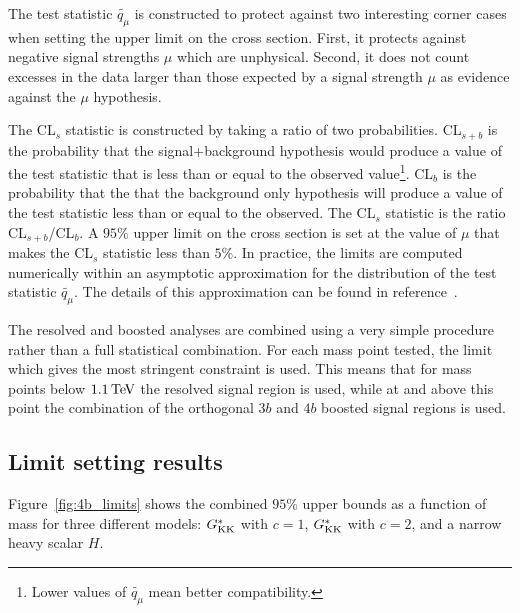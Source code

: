 The test statistic $\widetilde{q_{\mu}}$ is constructed to protect against two interesting corner cases when setting the upper limit on the cross section. First, it protects against negative signal strengths $\mu$ which are unphysical. Second, it does not count excesses in the data larger than those expected by a signal strength $\mu$ as evidence against the $\mu$ hypothesis. 

The CL$_{s}$ statistic is constructed by taking a ratio of two probabilities. CL$_{s+b}$ is the probability that the signal+background hypothesis would produce a value of the test statistic that is less than or equal to the observed value\footnote{Lower values of $\widetilde{q_{\mu}}$ mean better compatibility.}. CL$_{b}$ is the probability that the that the background only hypothesis will produce a value of the test statistic less than or equal to the observed. The CL$_{s}$ statistic is the ratio CL$_{s+b}$/CL$_{b}$. A $95\%$ upper limit on the cross section is set at the value of $\mu$ that makes the CL$_{s}$ statistic less than $5\%$. In practice, the limits are computed numerically within an asymptotic approximation for the distribution of the test statistic $\widetilde{q_{\mu}}$. The details of this approximation can be found in reference~\cite{Cowan:2010st}. 

The resolved and boosted analyses are combined using a very simple procedure rather than a full statistical combination. For each mass point tested, the limit which gives the most stringent constraint is used. This means that for mass points below $1.1 \TeV$ the resolved signal region is used, while at and above this point the combination of the orthogonal $3b$ and $4b$ boosted signal regions is used. 

\subsection{Limit setting results}

Figure~\ref{fig:4b_limits} shows the combined $95\%$ upper bounds as a function of mass for three different models: $G^*_{\rm KK}$ with $c=1$, $G^*_{\rm KK}$ with $c=2$, and a narrow heavy scalar $H$. 

